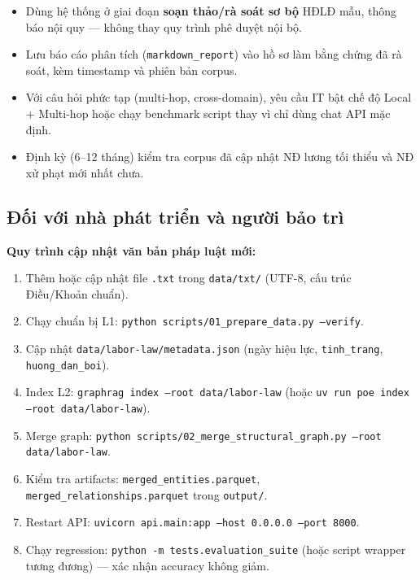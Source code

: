 \documentclass[../DoAn.tex]{subfiles}
\begin{document}
\begin{itemize}[nosep, leftmargin=*]
    \item Dùng hệ thống ở giai đoạn \textbf{soạn thảo/rà soát sơ bộ} HĐLĐ mẫu, thông báo nội quy --- không thay quy trình phê duyệt nội bộ.
    \item Lưu báo cáo phân tích (\texttt{markdown\_report}) vào hồ sơ làm bằng chứng đã rà soát, kèm timestamp và phiên bản corpus.
    \item Với câu hỏi phức tạp (multi-hop, cross-domain), yêu cầu IT bật chế độ Local + Multi-hop hoặc chạy benchmark script thay vì chỉ dùng chat API mặc định.
    \item Định kỳ (6--12 tháng) kiểm tra corpus đã cập nhật NĐ lương tối thiểu và NĐ xử phạt mới nhất chưa.
\end{itemize}

\subsection{Đối với nhà phát triển và người bảo trì}
\label{subsection:7.2.3}

\textbf{Quy trình cập nhật văn bản pháp luật mới:}
\begin{enumerate}[nosep, leftmargin=*]
    \item Thêm hoặc cập nhật file \texttt{.txt} trong \texttt{data/txt/} (UTF-8, cấu trúc Điều/Khoản chuẩn).
    \item Chạy chuẩn bị L1: \texttt{python scripts/01\_prepare\_data.py --verify}.
    \item Cập nhật \texttt{data/labor-law/metadata.json} (ngày hiệu lực, \texttt{tinh\_trang}, \texttt{huong\_dan\_boi}).
    \item Index L2: \texttt{graphrag index --root data/labor-law} (hoặc \texttt{uv run poe index --root data/labor-law}).
    \item Merge graph: \texttt{python scripts/02\_merge\_structural\_graph.py --root data/labor-law}.
    \item Kiểm tra artifacts: \texttt{merged\_entities.parquet}, \texttt{merged\_relationships.parquet} trong \texttt{output/}.
    \item Restart API: \texttt{uvicorn api.main:app --host 0.0.0.0 --port 8000}.
    \item Chạy regression: \texttt{python -m tests.evaluation\_suite} (hoặc script wrapper tương đương) --- xác nhận accuracy không giảm.
\end{enumerate}
\end{document}
